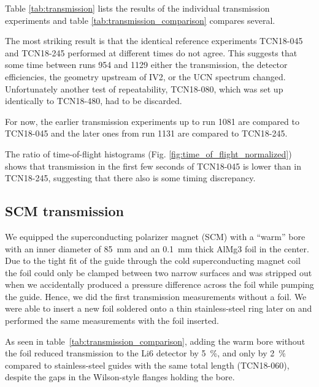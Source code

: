 \documentclass[10pt,letterpaper]{article}
\begin{document}
Table \ref{tab:transmission} lists the results of the individual transmission experiments and table \ref{tab:transmission_comparison} compares several.

The most striking result is that the identical reference experiments TCN18-045 and TCN18-245 performed at different times do not agree. This suggests that some time between runs 954 and 1129 either the transmission, the detector efficiencies, the geometry upstream of IV2, or the UCN spectrum changed. Unfortunately another test of repeatability, TCN18-080, which was set up identically to TCN18-480, had to be discarded.

For now, the earlier transmission experiments up to run 1081 are compared to TCN18-045 and the later ones from run 1131 are compared to TCN18-245.

The ratio of time-of-flight histograms (Fig. \ref{fig:time_of_flight_normalized}) shows that transmission in the first few seconds of TCN18-045 is lower than in TCN18-245, suggesting that there also is some timing discrepancy.

\subsection{SCM transmission}

We equipped the superconducting polarizer magnet (SCM) with a ``warm'' bore with an inner diameter of \SI{85}{\milli\meter} and an \SI{0.1}{\milli\meter} thick AlMg3 foil in the center. Due to the tight fit of the guide through the cold superconducting magnet coil the foil could only be clamped between two narrow surfaces and was stripped out when we accidentally produced a pressure difference across the foil while pumping the guide. Hence, we did the first transmission measurements without a foil. We were able to insert a new foil soldered onto a thin stainless-steel ring later on and performed the same measurements with the foil inserted.

As seen in table~\ref{tab:transmission_comparison}, adding the warm bore without the foil reduced transmission to the Li6 detector by \SI{5}{\percent}, and only by \SI{2}{\percent} compared to stainless-steel guides with the same total length (TCN18-060), despite the gaps in the Wilson-style flanges holding the bore.
\end{document}
